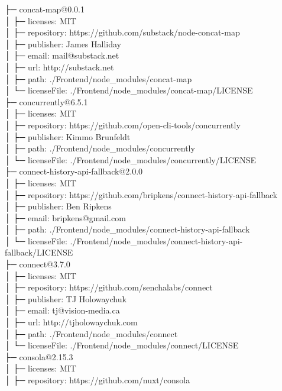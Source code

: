 ├─ concat-map@0.0.1\\
│  ├─ licenses: MIT\\
│  ├─ repository: https://github.com/substack/node-concat-map\\
│  ├─ publisher: James Halliday\\
│  ├─ email: mail@substack.net\\
│  ├─ url: http://substack.net\\
│  ├─ path: ./Frontend/node\_modules/concat-map\\
│  └─ licenseFile: ./Frontend/node\_modules/concat-map/LICENSE\\
├─ concurrently@6.5.1\\
│  ├─ licenses: MIT\\
│  ├─ repository: https://github.com/open-cli-tools/concurrently\\
│  ├─ publisher: Kimmo Brunfeldt\\
│  ├─ path: ./Frontend/node\_modules/concurrently\\
│  └─ licenseFile: ./Frontend/node\_modules/concurrently/LICENSE\\
├─ connect-history-api-fallback@2.0.0\\
│  ├─ licenses: MIT\\
│  ├─ repository: https://github.com/bripkens/connect-history-api-fallback\\
│  ├─ publisher: Ben Ripkens\\
│  ├─ email: bripkens@gmail.com\\
│  ├─ path: ./Frontend/node\_modules/connect-history-api-fallback\\
│  └─ licenseFile: ./Frontend/node\_modules/connect-history-api-fallback/LICENSE\\
├─ connect@3.7.0\\
│  ├─ licenses: MIT\\
│  ├─ repository: https://github.com/senchalabs/connect\\
│  ├─ publisher: TJ Holowaychuk\\
│  ├─ email: tj@vision-media.ca\\
│  ├─ url: http://tjholowaychuk.com\\
│  ├─ path: ./Frontend/node\_modules/connect\\
│  └─ licenseFile: ./Frontend/node\_modules/connect/LICENSE\\
├─ consola@2.15.3\\
│  ├─ licenses: MIT\\
│  ├─ repository: https://github.com/nuxt/consola\\
